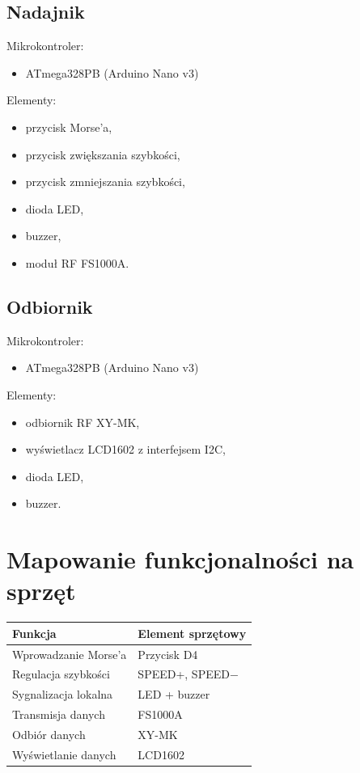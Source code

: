 \documentclass[a4paper,12pt]{article}
\begin{document}
\subsection{Nadajnik}

Mikrokontroler:
\begin{itemize}
\item ATmega328PB (Arduino Nano v3)
\end{itemize}

Elementy:
\begin{itemize}
\item przycisk Morse'a,
\item przycisk zwiększania szybkości,
\item przycisk zmniejszania szybkości,
\item dioda LED,
\item buzzer,
\item moduł RF FS1000A.
\end{itemize}

\subsection{Odbiornik}

Mikrokontroler:
\begin{itemize}
\item ATmega328PB (Arduino Nano v3)
\end{itemize}

Elementy:
\begin{itemize}
\item odbiornik RF XY-MK,
\item wyświetlacz LCD1602 z interfejsem I2C,
\item dioda LED,
\item buzzer.
\end{itemize}

\section{Mapowanie funkcjonalności na sprzęt}

\begin{table}[h]
\centering
\begin{tabular}{|l|l|}
\hline
Funkcja & Element sprzętowy \\
\hline
Wprowadzanie Morse'a & Przycisk D4 \\
Regulacja szybkości & SPEED+, SPEED− \\
Sygnalizacja lokalna & LED + buzzer \\
Transmisja danych & FS1000A \\
Odbiór danych & XY-MK \\
Wyświetlanie danych & LCD1602 \\
\hline
\end{tabular}
\end{table}
\end{document}
